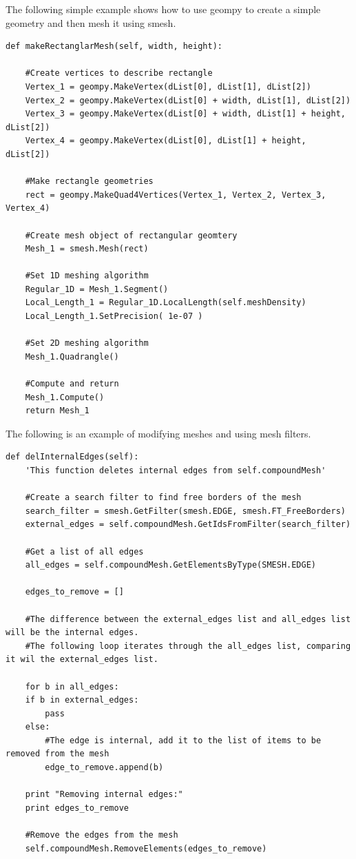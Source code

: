 The following simple example shows how to use geompy to create a simple geometry and then mesh it using smesh.

\begin{lstlisting}
def makeRectanglarMesh(self, width, height):

    #Create vertices to describe rectangle
    Vertex_1 = geompy.MakeVertex(dList[0], dList[1], dList[2])
    Vertex_2 = geompy.MakeVertex(dList[0] + width, dList[1], dList[2])
    Vertex_3 = geompy.MakeVertex(dList[0] + width, dList[1] + height, dList[2])
    Vertex_4 = geompy.MakeVertex(dList[0], dList[1] + height, dList[2])
    
    #Make rectangle geometries
    rect = geompy.MakeQuad4Vertices(Vertex_1, Vertex_2, Vertex_3, Vertex_4)
    
    #Create mesh object of rectangular geomtery
    Mesh_1 = smesh.Mesh(rect)
    
    #Set 1D meshing algorithm
    Regular_1D = Mesh_1.Segment()
    Local_Length_1 = Regular_1D.LocalLength(self.meshDensity)
    Local_Length_1.SetPrecision( 1e-07 )
    
    #Set 2D meshing algorithm
    Mesh_1.Quadrangle()
    
    #Compute and return
    Mesh_1.Compute()
    return Mesh_1 

\end{lstlisting}

The following is an example of modifying meshes and using mesh filters.

\begin{lstlisting}
def delInternalEdges(self):
    'This function deletes internal edges from self.compoundMesh'
    
    #Create a search filter to find free borders of the mesh
    search_filter = smesh.GetFilter(smesh.EDGE, smesh.FT_FreeBorders)
    external_edges = self.compoundMesh.GetIdsFromFilter(search_filter)
    
    #Get a list of all edges
    all_edges = self.compoundMesh.GetElementsByType(SMESH.EDGE)
    
    edges_to_remove = []
    
    #The difference between the external_edges list and all_edges list will be the internal edges.
    #The following loop iterates through the all_edges list, comparing it wil the external_edges list.
    
    for b in all_edges:
	if b in external_edges:
	    pass
	else:
	    #The edge is internal, add it to the list of items to be removed from the mesh
	    edge_to_remove.append(b)
    
    print "Removing internal edges:"
    print edges_to_remove
    
    #Remove the edges from the mesh
    self.compoundMesh.RemoveElements(edges_to_remove)
    
\end{lstlisting}        


